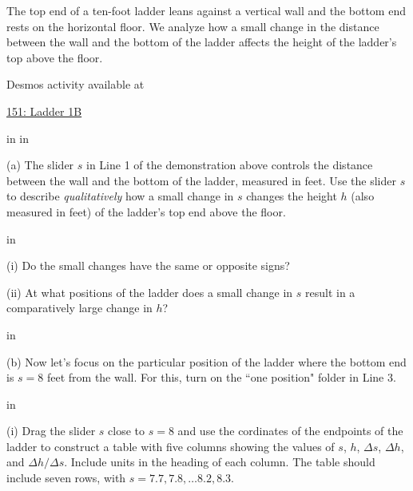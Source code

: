 \documentclass{ximera}
\newcommand{\pskip}{\vskip 0.1 in}
\begin{document}
\begin{example}   \label{Ex435rsfeetr}

The top end of a ten-foot ladder leans against a vertical wall and the bottom end rests on the horizontal floor. We analyze how a small change in the distance between the wall and the bottom of the ladder affects the height of the ladder's top above the floor. 

 
\begin{onlineOnly}
    \begin{center}
\end{center}
\end{onlineOnly}

Desmos activity available at

\href{https://www.desmos.com/calculator/dvyuifyyg4}{151: Ladder 1B}

\pskip \pskip

\begin{question}  \label{Qdsfesarr4}

(a) The slider $s$ in Line 1 of the demonstration above controls the distance between the wall and the bottom of the ladder, measured in feet. Use the slider $s$ to describe \emph{qualitatively} how a small change in $s$ changes the height $h$ (also measured in feet) of the ladder's top end above the floor. 

\pskip

(i) Do the small changes have the same or opposite signs?

(ii) At what positions of the ladder does a small change in $s$ result in a comparatively large change in $h$?

\pskip

(b) Now let's focus on the particular position of the ladder where the bottom end is  $s=8$ feet from the wall. For this, turn on the ``one position" folder in Line 3.

\pskip

(i) Drag the slider $s$ close to $s=8$ and use the cordinates of the endpoints of the ladder to construct a table with five columns showing the values of $s$, $h$, $\Delta s$, $\Delta h$, and $\Delta h / \Delta s$. Include units in the heading of each column. The table should include seven rows, with $s=7.7, 7.8, \ldots 8.2, 8.3$.


\end{question}
\end{example}
\end{document}
